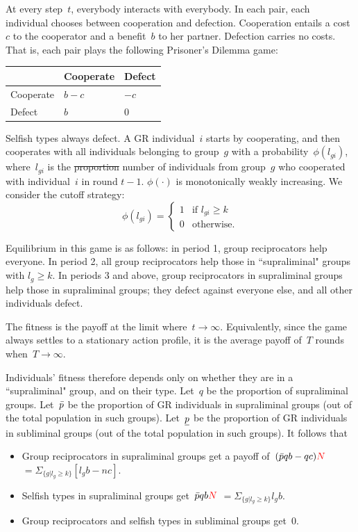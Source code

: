 \documentclass[12pt,a4paper]{article}
\newcommand{\mm}[1]{{\color{red} #1}}
\begin{document}
At every step~$t$, everybody interacts with everybody. In each pair, each individual chooses between cooperation and defection. Cooperation entails a cost~$c$ to the cooperator and a benefit~$b$ to her partner. Defection carries no costs. That is, each pair plays the following Prisoner's Dilemma game:
\begin{center}
    \begin{tabularx}{0.5\textwidth}{|x|x|x|}
        \hline
        &   Cooperate   &   Defect  \\
        \hline
        Cooperate   &   $b-c$   &   $-c$    \\
        \hline
        Defect  &   $b$ &   $0$   \\
        \hline
    \end{tabularx}
\end{center}

Selfish types always defect. A GR individual~$i$ starts by cooperating, and then cooperates with all individuals belonging to group~$g$ with a probability~$\phi(l_{gi})$, where~$l_{gi}$ is the \sout{proportion} \mm{number} of individuals from group~$g$ who cooperated with individual~$i$ in round $t-1$.
$\phi(\cdot)$ is monotonically weakly increasing. We consider the cutoff strategy: 
$$
    \phi(l_{gi}) =
    \begin{cases}
        1   &   \text{if } l_{gi} \geq k  \\
        0   &   \text{otherwise.}
    \end{cases}
$$

Equilibrium in this game is as follows: in period 1, group reciprocators help
everyone. In period 2, all group reciprocators help those in ``supraliminal"
groups with $l_g \geq k$. In periods 3 and above, group reciprocators in supraliminal
groups help those in supraliminal groups; they defect against everyone else,
and all other individuals defect.

The fitness is the payoff at the limit where~$t\to\infty$. Equivalently, since the game always settles to a stationary action profile, it is the average payoff of~$T$ rounds when~$T\to\infty$. 

%
Individuals' fitness therefore depends only on whether they are in a ``supraliminal" group, and on their type. Let~$q$ be the 
proportion of supraliminal groups. Let~$\bar{p}$ be the proportion of 
GR individuals in supraliminal groups (out of the total population in such groups). Let~$\underline{p}$ be the proportion of GR individuals in subliminal groups (out of the total population in such groups). It follows that
\begin{itemize}
    \item Group reciprocators in supraliminal groups get a payoff of~$(\bpi qb - qc)\mm{N}$ \mm{$= \Sigma_{\{g|l_g \geq k\}}[l_gb-nc]$}.
    \item Selfish types in supraliminal groups get~$\bpi qb\mm{N}$ \mm{$= \Sigma_{\{g|l_g \geq k\}}l_gb$}.
    \item Group reciprocators and selfish types in subliminal groups get~$0$.
\end{itemize}
\end{document}
